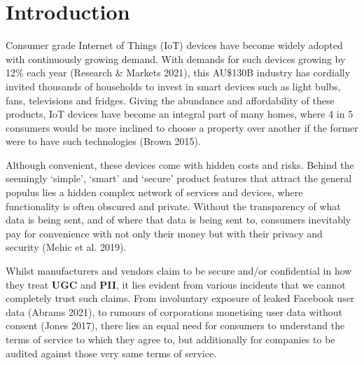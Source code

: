\documentclass[]{resources/unswthesis}
\begin{document}
\frontmatter  
\maketitle





\tableofcontents
\listoffigures  %
\listoftables  %

\mainmatter

\hypertarget{introduction}{%
\chapter{Introduction}\label{introduction}}

Consumer grade Internet of Things (IoT) devices have become widely
adopted with continuously growing demand. With demands for such devices
growing by 12\% each year (Research \& Markets 2021), this AU\$130B
industry has cordially invited thousands of households to invest in
smart devices such as light bulbs, fans, televisions and fridges. Giving
the abundance and affordability of these products, IoT devices have
become an integral part of many homes, where 4 in 5 consumers would be
more inclined to choose a property over another if the former were to
have such technologies (Brown 2015).

Although convenient, these devices come with hidden costs and risks.
Behind the seemingly `simple', `smart' and `secure' product features
that attract the general populus lies a hidden complex network of
services and devices, where functionality is often obscured and private.
Without the transparency of what data is being sent, and of where that
data is being sent to, consumers inevitably pay for convenience with not
only their money but with their privacy and security (Mehic et al.
2019).

Whilst manufacturers and vendors claim to be secure and/or confidential
in how they treat \textbf{UGC} and \textbf{PII}, it lies evident from
various incidents that we cannot completely trust such claims. From
involuntary exposure of leaked Facebook user data (Abrams 2021), to
rumours of corporations monetising user data without consent (Jones
2017), there lies an equal need for consumers to understand the terms of
service to which they agree to, but additionally for companies to be
audited against those very same terms of service.
\end{document}
